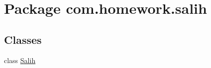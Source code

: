 \hypertarget{namespacecom_1_1homework_1_1salih}{}\section{Package com.\+homework.\+salih}
\label{namespacecom_1_1homework_1_1salih}
\subsection*{Classes}
\begin{DoxyCompactItemize}
\item 
class \hyperlink{classcom_1_1homework_1_1salih_1_1_salih}{Salih}
\end{DoxyCompactItemize}
